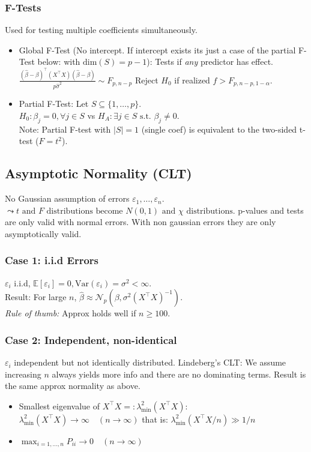 \subsubsection*{F-Tests}
Used for testing multiple coefficients simultaneously.
\begin{itemize}
    \item Global F-Test (No intercept. If intercept exists its just a case of the partial F-Test below: with $\text{dim}(S) = p-1$): Tests if \textit{any} predictor has effect.
    $\frac{(\hat{\beta} - \beta)^\top (X^\top X) (\hat{\beta} - \beta)}{p \hat{\sigma}^2} \sim F_{p, n-p}$
    Reject $H_0$ if realized $f > F_{p, n-p, 1-\alpha}$.
    \item Partial F-Test: Let $S \subseteq \{1, \dots, p\}$.
    \\ $H_0: \beta_j = 0, \forall j \in S$ vs $H_A: \exists j \in S \text{ s.t. } \beta_j \neq 0$.
    \\ Note: Partial F-test with $|S|=1$ (single coef) is equivalent to the two-sided t-test ($F = t^2$).
\end{itemize}

\subsection*{Asymptotic Normality (CLT)}
No Gaussian assumption of errors $\varepsilon_1, \dots, \varepsilon_n$.$ \leadsto t \text{ and } F \text{ distributions become } N(0, 1) \text{ and } \chi \text{ distributions}$. p-values and tests are only valid with normal errors. With non gaussian errors they are only asymptotically valid.


\subsubsection*{Case 1: i.i.d Errors}
$\varepsilon_i$ i.i.d, $\mathbb{E}[\varepsilon_i]=0, \text{Var}(\varepsilon_i)=\sigma^2 < \infty$.
\\ Result: For large $n$, $\hat{\beta} \approx \mathcal{N}_p(\beta, \sigma^2(X^\top X)^{-1})$.
\\ \textit{Rule of thumb:} Approx holds well if $n \ge 100$.

\subsubsection*{Case 2: Independent, non-identical}
$\varepsilon_i$ independent but not identically distributed. Lindeberg's CLT: We assume increasing $n$ always yields more info and there are no dominating terms. Result is the same approx normality as above.
\begin{itemize}
    \item Smallest eigenvalue of $X^\top X =: \lambda_{\min}^2(X^\top X)$: $\lambda_{\min}^2(X^\top X) \to \infty \quad (n \to \infty)$
    that is: $\lambda_{\min}^2 (X^\top X/n) \gg 1/n$
    \item $\max_{i=1,\dots,n} P_{ii} \to 0 \quad (n \to \infty)$
\end{itemize}


